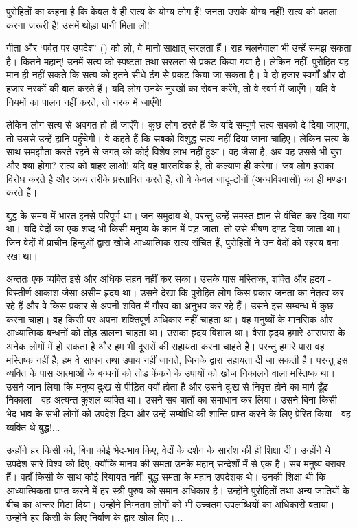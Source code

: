 पुरोहितों का कहना है कि केवल वे ही सत्य के योग्य लोग हैं! जनता उसके योग्य नहीं! सत्य को पतला करना जरूरी है! उसमें थोड़ा पानी मिला लो! 

गीता और ‘पर्वत पर उपदेश’ () को लो, वे मानो साक्षात् सरलता हैं। राह चलनेवाला भी उन्हें समझ सकता है। कितने महान्! उनमें सत्य को स्पष्टता तथा सरलता से प्रकट किया गया है। लेकिन नहीं, पुरोहित यह मान ही नहीं सकते कि सत्य को इतने सीधे ढंग से प्रकट किया जा सकता है। वे दो हजार स्वर्गों और दो हजार नरकों की बात करते हैं। यदि लोग उनके नुस्खों का सेवन करेंगे, तो वे स्वर्ग में जाएँगे। यदि वे नियमों का पालन नहीं करते, तो नरक में जाएँगे! 

लेकिन लोग सत्य से अवगत हो ही जाएँगे। कुछ लोग डरते हैं कि यदि सम्पूर्ण सत्य सबको दे दिया जाएगा, तो उससे उन्हें हानि पहुँचेगी। वे कहते हैं कि सबको विशुद्ध सत्य नहीं दिया जाना चाहिए। लेकिन सत्य के साथ समझौता करते रहने से जगत् को कोई विशेष लाभ नहीं हुआ। वह जैसा है, अब वह उससे भी बुरा और क्या होगा? सत्य को बाहर लाओ! यदि वह वास्तविक है, तो कल्याण ही करेगा। जब लोग इसका विरोध करते है और अन्य तरीके प्रस्तावित करते हैं, तो वे केवल जादू-टोनों (अन्धविश्वासों) का ही मण्डन करते हैं। 

बुद्ध के समय में भारत इनसे परिपूर्ण था। जन-समुदाय थे, परन्तु उन्हें समस्त ज्ञान से वंचित कर दिया गया था। यदि वेदों का एक शब्द भी किसी मनुष्य के कान में पड़ जाता, तो उसे भीषण दण्ड दिया जाता था। जिन वेदों में प्राचीन हिन्दुओं द्वारा खोजे आध्यात्मिक सत्य संचित हैं, पुरोहितों ने उन वेदों को रहस्य बना रखा था। 

अन्ततः एक व्यक्ति इसे और अधिक सहन नहीं कर सका। उसके पास मस्तिष्क, शक्ति और हृदय - विस्तीर्ण आकाश जैसा असीम हृदय था। उसने देखा कि पुरोहित लोग किस प्रकार जनता का नेतृत्व कर रहे हैं और वे किस प्रकार से अपनी शक्ति में गौरव का अनुभव कर रहे हैं। उसने इस सम्बन्ध में कुछ करना चाहा। वह किसी पर अपना शक्तिपूर्ण अधिकार नहीं चाहता था। वह मनुष्यों के मानसिक और आध्यात्मिक बन्धनों को तोड़ डालना चाहता था। उसका हृदय विशाल था। वैसा हृदय हमारे आसपास के अनेक लोगों में हो सकता है और हम भी दूसरों की सहायता करना चाहते हैं। परन्तु हमारे पास वह मस्तिष्क नहीं है; हम वे साधन तथा उपाय नहीं जानते, जिनके द्वारा सहायता दी जा सकती है। परन्तु इस व्यक्ति के पास आत्माओं के बन्धनों को तोड़ फेंकने के उपायों को खोज निकालने वाला मस्तिष्क था। उसने जान लिया कि मनुष्य दुःख से पीड़ित क्यों होता है और उसने दुःख से निवृत्त होने का मार्ग ढूँढ़ निकाला। वह अत्यन्त कुशल व्यक्ति था। उसने सब बातों का समाधान कर लिया। उसने बिना किसी भेद-भाव के सभी लोगों को उपदेश दिया और उन्हें सम्बोधि की शान्ति प्राप्त करने के लिए प्रेरित किया। वह व्यक्ति थे बुद्ध!... 

उन्होंने हर किसी को, बिना कोई भेद-भाव किए, वेदों के दर्शन के सारांश की ही शिक्षा दी। उन्होंने ये उपदेश सारे विश्व को दिए, क्योंकि मानव की समता उनके महान् सन्देशों में से एक है। सब मनुष्य बराबर हैं। वहाँ किसी के साथ कोई रियायत नहीं! बुद्ध समता के महान उपदेशक थे। उनकी शिक्षा थी कि आध्यात्मिकता प्राप्त करने में हर स्त्री-पुरुष को समान अधिकार है। उन्होंने पुरोहितों तथा अन्य जातियों के बीच का अन्तर मिटा दिया। उन्होंने निम्नतम लोगों को भी उच्चतम उपलब्धियों का अधिकारी बताया। उन्होंने हर किसी के लिए निर्वाण के द्वार खोल दिए।... 

